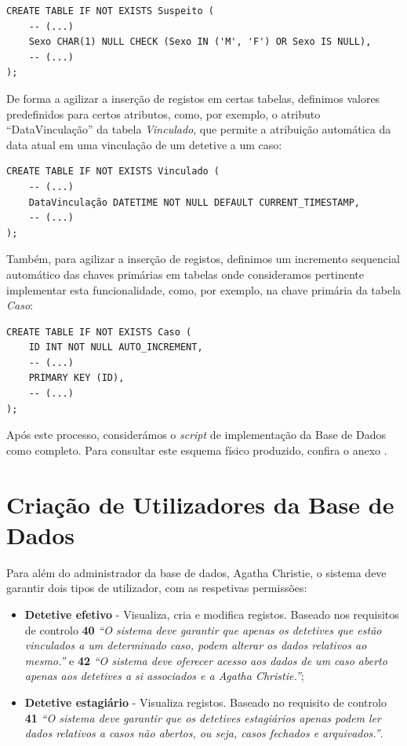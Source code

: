 \documentclass[a4paper,12pt]{scrreprt}
\begin{document}
\vspace{0.4cm}
\begin{lstlisting}[escapechar=!]
CREATE TABLE IF NOT EXISTS Suspeito (
    -- (...)
    Sexo CHAR(1) NULL CHECK (Sexo IN ('M', 'F') OR Sexo IS NULL),
    -- (...)
);
\end{lstlisting}

De forma a agilizar a inserção de registos em certas tabelas, definimos valores predefinidos para certos atributos, como, por exemplo, o atributo “DataVinculação” da tabela \textit{Vinculado}, que permite a atribuição automática da data atual em uma vinculação de um detetive a um caso:

\vspace{0.4cm}
\begin{lstlisting}[escapechar=!]
CREATE TABLE IF NOT EXISTS Vinculado (
    -- (...)
    DataVinculação DATETIME NOT NULL DEFAULT CURRENT_TIMESTAMP,
    -- (...)
);
\end{lstlisting}

Também, para agilizar a inserção de registos, definimos um incremento sequencial automático das chaves primárias em tabelas onde consideramos pertinente implementar esta funcionalidade, como, por exemplo, na chave primária da tabela \textit{Caso}:   

\vspace{0.4cm}
\begin{lstlisting}[escapechar=!]
CREATE TABLE IF NOT EXISTS Caso (
    ID INT NOT NULL AUTO_INCREMENT,
    -- (...)
    PRIMARY KEY (ID),
    -- (...)
);
\end{lstlisting}

Após este processo, considerámos o \textit{script} de implementação da Base de Dados como completo. Para consultar este esquema físico produzido, confira o anexo \textit{}.

\clearpage
\section{Criação de Utilizadores da Base de Dados}

    Para além do administrador da base de dados, Agatha Christie, o sistema deve garantir dois tipos de utilizador, com as respetivas permissões:
    \begin{itemize}
        \item \textbf{Detetive efetivo} - Visualiza, cria e modifica registos. Baseado nos requisitos de controlo \textbf{40} \textit{“O sistema deve garantir que apenas os detetives que estão vinculados a um determinado caso, podem alterar os dados relativos ao mesmo.”} e \textbf{42} \textit{“O sistema deve oferecer acesso aos dados de um caso aberto apenas aos detetives a si associados e a Agatha Christie.”};
        \item \textbf{Detetive estagiário} - Visualiza registos. Baseado no requisito de controlo \textbf{41} \textit{“O sistema deve garantir que os detetives estagiários apenas podem ler dados relativos a casos não abertos, ou seja, casos fechados e arquivados.”}.
    \end{itemize}
\end{document}
